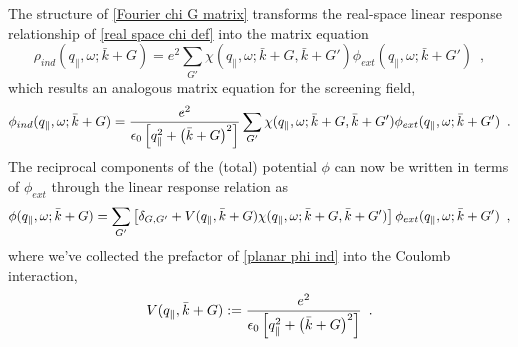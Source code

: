 The structure of \eqref{Fourier chi G matrix} transforms the real-space linear response relationship of \eqref{real space chi def} into the matrix equation
\begin{equation}
    \label{planar linear response}
     \rho_{ind}(q_\parallel,\omega;\bar k+G) = e^2\sum_{G'}\chi(q_\parallel,\omega;\bar k+G, \bar k+G')
     \phi_{ext}(q_\parallel,\omega;\bar k+G')
     \,\,\,,
\end{equation}
which results an analogous matrix equation for the screening field,
\begin{equation}
    \label{planar phi ind}
     \phi_{ind}(q_\parallel,\omega;\bar k+G) = \frac{e^2}{\epsilon_0\left[ q_\parallel^2+\left(\bar k+G\right)^2\right]} \sum_{G'}\chi(q_\parallel,\omega;\bar k+G, \bar k+G')
     \phi_{ext}(q_\parallel,\omega;\bar k+G')
     \,\,\,.
\end{equation}
The reciprocal components of the (total) potential $\phi$ can now be written in terms of $\phi_{ext}$ through the linear response relation as
\begin{equation}
    \label{planar phi to phi ext relation}
    \phi(q_\parallel,\omega;\bar k+G) 
    =
    \sum_{G'}
    \left[
    \delta_{G,G'}
    +
    V(q_\parallel,\bar k+G)
    \chi(q_\parallel,\omega;\bar k+G, \bar k+G')
    \right]
    \phi_{ext}(q_\parallel,\omega;\bar k+ G')
    \,\,\,,
\end{equation}
where we've collected the prefactor of \eqref{planar phi ind} into the Coulomb interaction,
\begin{equation}
    \label{V def}
    V(q_\parallel,\bar k+G):=
    \frac{e^2}{\epsilon_0\left[ q_\parallel^2+\left(\bar k+G\right)^2\right]}
    \,\,\,.
\end{equation}